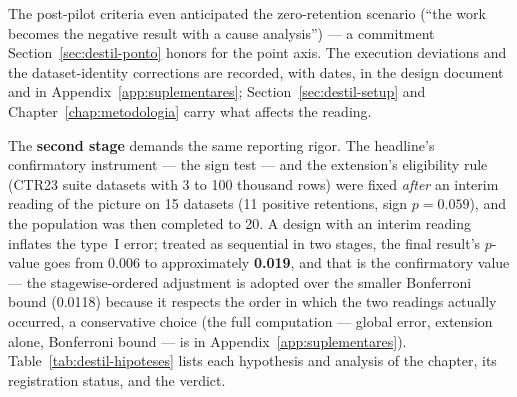 The post-pilot criteria even anticipated the zero-retention scenario
(``the work becomes the negative result with a cause analysis'') ---
a commitment Section~\ref{sec:destil-ponto} honors for the point
axis. The execution deviations and the dataset-identity corrections
are recorded, with dates, in the design document and in
Appendix~\ref{app:suplementares};
Section~\ref{sec:destil-setup} and Chapter~\ref{chap:metodologia}
carry what affects the reading.

The \textbf{second stage} demands the same reporting rigor. The
headline's confirmatory instrument --- the sign test --- and the
extension's eligibility rule (CTR23 suite datasets with 3 to 100
thousand rows) were fixed \emph{after} an interim reading of the
picture on 15 datasets (11 positive retentions, sign $p=0.059$), and
the population was then completed to 20. A design with an interim
reading inflates the type~I error; treated as sequential in two
stages, the final result's $p$-value goes from 0.006 to
approximately \textbf{0.019}, and that is the confirmatory value ---
the stagewise-ordered adjustment is adopted over the smaller
Bonferroni bound (0.0118) because it respects the order in which the
two readings actually occurred, a conservative choice (the full
computation --- global error, extension alone, Bonferroni bound ---
is in Appendix~\ref{app:suplementares}).
Table~\ref{tab:destil-hipoteses} lists each hypothesis and analysis
of the chapter, its registration status, and the verdict.

